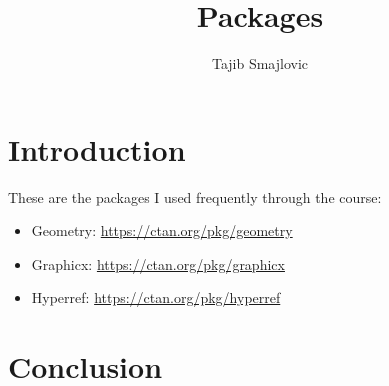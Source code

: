 \documentclass{article}
\title{Packages}
\author{Tajib Smajlovic}
\date{}
\begin{document}
	\maketitle
	
	\section{Introduction}
	These are the packages I used frequently through the course:
	
	\begin{itemize}
		\item Geometry: \url{https://ctan.org/pkg/geometry}
		\item Graphicx: \url{https://ctan.org/pkg/graphicx}
		\item Hyperref: \url{https://ctan.org/pkg/hyperref}
	\end{itemize}
	
	\subsection{}
	
	\subsection{}
	
	
	\section{Conclusion}
	
	
\end{document}
